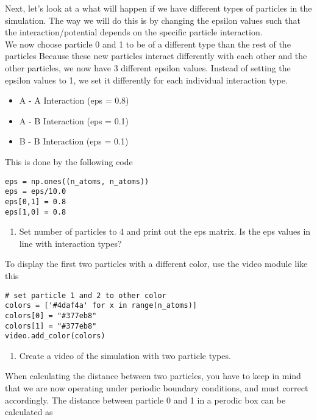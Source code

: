 \documentclass{article}
\begin{document}
Next, let's look at a what will happen if we have different types of particles in the simulation.
The way we will do this is by changing the epsilon values such that the interaction/potential depends on the specific particle interaction.\\

We now choose particle 0 and 1 to be of a different type than the rest of the particles
Because these new particles interact differently with each other and the other particles, we now have 3 different epsilon values.
Instead of setting the epsilon values to 1, we set it differently for each individual interaction type.

\begin{itemize}
    \item A - A Interaction (eps = 0.8)
    \item A - B Interaction (eps = 0.1)
    \item B - B Interaction (eps = 0.1)
\end{itemize}

This is done by the following code

\begin{lstlisting}
eps = np.ones((n_atoms, n_atoms))
eps = eps/10.0
eps[0,1] = 0.8
eps[1,0] = 0.8
\end{lstlisting}

\begin{enumerate}[resume]
    \item Set number of particles to 4 and print out the eps matrix.
        Is the eps values in line with interaction types?
\end{enumerate}

To display the first two particles with a different color, use the video module like this
\begin{lstlisting}
# set particle 1 and 2 to other color
colors = ['#4daf4a' for x in range(n_atoms)]
colors[0] = "#377eb8"
colors[1] = "#377eb8"
video.add_color(colors)
\end{lstlisting}


\begin{enumerate}[resume]
    \item Create a video of the simulation with two particle types.
\end{enumerate}

When calculating the distance between two particles, you have to keep in mind that we are now operating under periodic boundary conditions, and must correct accordingly.
The distance between particle 0 and 1 in a perodic box can be calculated as
\end{document}
